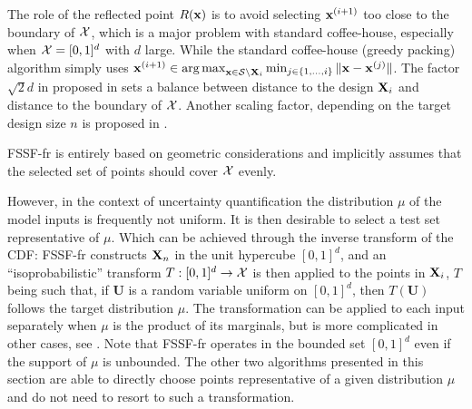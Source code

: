 The role of the reflected point $R({\bf x})$ is to avoid selecting ${\bf x}^{(i+1)}$ too close to the boundary of $\mathcal{X}$, which is a major problem with standard coffee-house, especially when $\mathcal{X}=[0,1]^d$ with $d$ large. 
While the standard coffee-house (greedy packing) algorithm simply uses ${\bf x}^{(i+1)} \in \operatorname*{arg\,max}_{{\bf x} \in \mathcal{S} \setminus {\bf X}_i} \min_{j \in \{1,\ldots,i\}} \|{\bf x}-{\bf x}^{(j)}\|$. 
The factor $\sqrt{2}d$ in  proposed in \citet{shang_apley_2020} sets a balance between distance to the design ${\bf X}_i$ and distance to the boundary of $\mathcal{X}$. 
Another scaling factor, depending on the target design size $n$ is proposed in \citet{NogalesPR2021}.
 
FSSF-fr is entirely based on geometric considerations and implicitly assumes that the selected set of points should cover $\mathcal{X}$ evenly. 

However, in the context of uncertainty quantification the distribution $\mu$ of the model inputs is frequently not uniform. 
It is then desirable to select a test set representative of $\mu$. 
Which can be achieved through the inverse transform of the CDF: FSSF-fr constructs ${\bf X}_n$ in the unit hypercube $[0,1]^d$, and an ``isoprobabilistic'' transform $T:[0,1]^d \rightarrow \mathcal{X}$ is then applied to the points in ${\bf X}_i$, $T$ being such that, if $\boldsymbol{U}$ is a random variable uniform on $[0,1]^d$, then $T(\boldsymbol{U})$ follows the target distribution $\mu$. 
The transformation can be applied to each input separately when $\mu$ is the product of its marginals, but is more complicated in other cases, see \citep[Chap.~4]{lemaire_2009}. 
Note that FSSF-fr operates in the bounded set $[0,1]^d$ even if the support of $\mu$ is unbounded. 
The other two algorithms presented in this section are able to directly choose points representative of a given distribution $\mu$ and do not need to resort to such a transformation.

